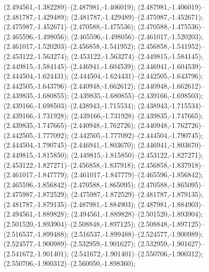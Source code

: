  (2.494561,-1.382289)--(2.487981,-1.406019);
 (2.487981,-1.406019)--(2.481787,-1.429489);
 (2.481787,-1.429489)--(2.475987,-1.452671);
 (2.475987,-1.452671)--(2.470588,-1.475536);
 (2.470588,-1.475536)--(2.465596,-1.498056);
 (2.465596,-1.498056)--(2.461017,-1.520203);
 (2.461017,-1.520203)--(2.456858,-1.541952);
 (2.456858,-1.541952)--(2.453122,-1.563274);
 (2.453122,-1.563274)--(2.449815,-1.584145);
 (2.449815,-1.584145)--(2.446941,-1.604539);
 (2.446941,-1.604539)--(2.444504,-1.624431);
 (2.444504,-1.624431)--(2.442505,-1.643796);
 (2.442505,-1.643796)--(2.440948,-1.662612);
 (2.440948,-1.662612)--(2.439835,-1.680855);
 (2.439835,-1.680855)--(2.439166,-1.698503);
 (2.439166,-1.698503)--(2.438943,-1.715534);
 (2.438943,-1.715534)--(2.439166,-1.731928);
 (2.439166,-1.731928)--(2.439835,-1.747665);
 (2.439835,-1.747665)--(2.440948,-1.762726);
 (2.440948,-1.762726)--(2.442505,-1.777092);
 (2.442505,-1.777092)--(2.444504,-1.790745);
 (2.444504,-1.790745)--(2.446941,-1.803670);
 (2.446941,-1.803670)--(2.449815,-1.815850);
 (2.449815,-1.815850)--(2.453122,-1.827271);
 (2.453122,-1.827271)--(2.456858,-1.837918);
 (2.456858,-1.837918)--(2.461017,-1.847779);
 (2.461017,-1.847779)--(2.465596,-1.856842);
 (2.465596,-1.856842)--(2.470588,-1.865095);
 (2.470588,-1.865095)--(2.475987,-1.872529);
 (2.475987,-1.872529)--(2.481787,-1.879135);
 (2.481787,-1.879135)--(2.487981,-1.884903);
 (2.487981,-1.884903)--(2.494561,-1.889828);
 (2.494561,-1.889828)--(2.501520,-1.893904);
 (2.501520,-1.893904)--(2.508848,-1.897125);
 (2.508848,-1.897125)--(2.516537,-1.899488);
 (2.516537,-1.899488)--(2.524577,-1.900989);
 (2.524577,-1.900989)--(2.532959,-1.901627);
 (2.532959,-1.901627)--(2.541672,-1.901401);
 (2.541672,-1.901401)--(2.550706,-1.900312);
 (2.550706,-1.900312)--(2.560050,-1.898360);
